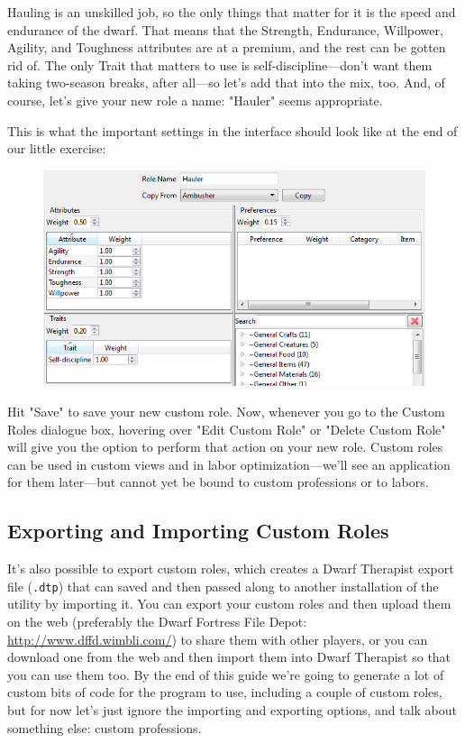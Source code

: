 \documentclass[]{article}
\begin{document}
Hauling is an unskilled job, so the only things that matter for it is the speed and endurance of the
dwarf. That means that the Strength, Endurance, Willpower, Agility, and Toughness attributes are at a
premium, and the rest can be gotten rid of. The only Trait that matters to use is self-discipline---don't
want them taking two-season breaks, after all---so let's add that into the mix, too. And, of course,
let's give your new role a name: "Hauler" seems appropriate.

This is what the important settings in the interface should look like at the end of our little exercise:
\begin{figure}[h!]
\vspace{-5pt}
\centering \includegraphics[width=\linewidth]{Sec3Fig9}
\vspace{-10pt}
\end{figure}

Hit "Save" to save your new custom role. Now, whenever you go to the Custom Roles dialogue box, hovering
over "Edit Custom Role" or "Delete Custom Role" will give you the option to perform that action on your
new role. Custom roles can be used in custom views and in labor optimization---we'll see an application
for them later---but cannot yet be bound to custom professions or to labors.

\subsection{Exporting and Importing Custom Roles}
It's also possible to export custom roles, which creates a Dwarf Therapist export file (\texttt{.dtp})
that can saved and then passed along to another installation of the utility by importing it. You can
export your custom roles and then upload them on the web (preferably the Dwarf Fortress File Depot:
\url{http://www.dffd.wimbli.com/}) to share them with other players, or you can download one from the web
and then import them into Dwarf Therapist so that you can use them too. By the end of this guide we're
going to generate a lot of custom bits of code for the program to use, including a couple of custom
roles, but for now let's just ignore the importing and exporting options, and talk about something else:
custom professions.
\end{document}

